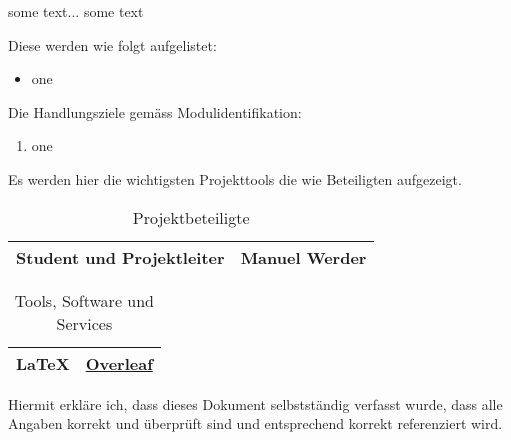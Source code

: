 
\label{einleitung}
\setcounter{page}{1}
\normalsize
some text...
\vSpaceStyle{}
some text

Diese werden wie folgt aufgelistet:

\begin{itemize}
    \item one
\end{itemize}


Die Handlungsziele gemäss Modulidentifikation:

\begin{enumerate}
    \item one
\end{enumerate}


Es werden hier die wichtigsten Projekttools die wie Beteiligten aufgezeigt.

\begin{table}[h!]
    \centering
    \begin{tabularx}{0.8\textwidth} {
    | >{\raggedright\arraybackslash}X
    | >{\raggedright\arraybackslash}X | }
        \hline
        Student und Projektleiter & Manuel Werder \\
        \hline
    \end{tabularx}
    \caption{Projektbeteiligte}
    \label{tab:1}
\end{table}

\begin{table}[h!]
    \centering
    \begin{tabularx}{0.8\textwidth} {
    | >{\raggedright\arraybackslash}X
    | >{\raggedright\arraybackslash}X | }
        \hline
        \LaTeX & \href{https://www.overleaf.com}{Overleaf} \\
        \hline
    \end{tabularx}
    \caption{Tools, Software und Services}
    \label{tab:2}
\end{table}



\label{konzepte}



Hiermit erkläre ich, dass dieses Dokument selbstständig verfasst wurde, dass alle Angaben korrekt
und überprüft sind und entsprechend korrekt referenziert wird.
\vSpaceStyle{}
\gitAuthorDate~\gitAuthorName
